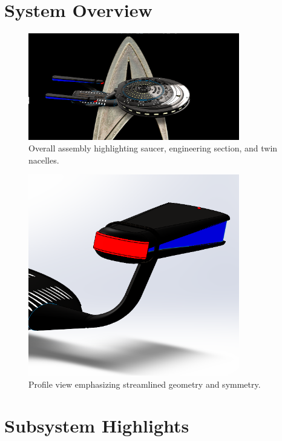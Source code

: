 \documentclass[12pt]{article}
\begin{document}
\section*{System Overview}
\begin{figure}[H]
    \centering
    \includegraphics[width=0.82\textwidth]{final_1.png}
    \caption{Overall assembly highlighting saucer, engineering section, and twin nacelles.}
\end{figure}

\begin{figure}[H]
    \centering
    \includegraphics[width=0.82\textwidth]{sleek.png}
    \caption{Profile view emphasizing streamlined geometry and symmetry.}
\end{figure}

\section*{Subsystem Highlights}
\end{document}
